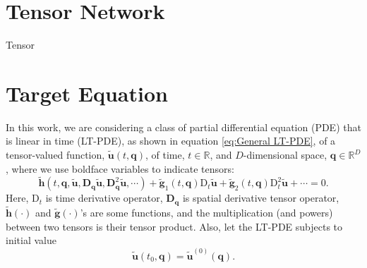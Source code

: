 \documentclass[preprint, 12pt]{revtex4-2}
\numberwithin{equation}{section}
\begin{document}
\section{Tensor Network}
Tensor 

\section{Target Equation}
In this work, we are considering a class of partial differential equation (PDE) that is linear in time (LT-PDE), as shown in equation \ref{eq:General LT-PDE}, of a tensor-valued function, $\tilde{\mathbf{u}}(t, \mathbf{q})$, of time, $t\in \mathbb{R}$, and $D$-dimensional space, $\mathbf{q}\in\mathbb{R}^D$, where we use boldface variables to indicate tensors:
\begin{equation}\label{eq:General LT-PDE}
    \tilde{\mathbf{h}}(t, \mathbf{q}, \tilde{\mathbf{u}}, \mathbf{D}_\mathbf{q}\tilde{\mathbf{u}}, \mathbf{D}_\mathbf{q}^2\tilde{\mathbf{u}}, \cdots) + \tilde{\mathbf{g}}_{1}(t, \mathbf{q})\text{D}_t\tilde{\mathbf{u}} + \tilde{\mathbf{g}}_{2}(t, \mathbf{q})\text{D}_t^2\tilde{\mathbf{u}} + \cdots = 0.
\end{equation}
Here, $\text{D}_t$ is time derivative operator, $\mathbf{D}_\mathbf{q}$ is spatial derivative tensor operator, $\tilde{\mathbf{h}}(\cdot)$ and $\tilde{\mathbf{g}}(\cdot)$'s are some functions, and the multiplication (and powers) between two tensors is their tensor product. Also, let the LT-PDE subjects to initial value 
\begin{equation}
    \tilde{\mathbf{u}}(t_0, \mathbf{q}) = \tilde{\mathbf{u}}^{(0)}(\mathbf{q}).
\end{equation}
\end{document}
